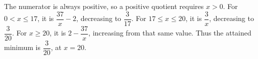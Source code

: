 The numerator is always positive, so a positive quotient requires $ x>0 $. For $ 0<x\le17 $, it is $\dfrac{37}{x}-2 $, decreasing to $\dfrac{3}{17}$. For $ 17\le x\le20 $, it is $\dfrac{3}{x}$, decreasing to $\dfrac{3}{20}$. For $ x\ge20 $, it is $ 2-\dfrac{37}{x}$, increasing from that same value. Thus the attained minimum is $\boxed{\dfrac{3}{20}}$, at $ x=20 $.
